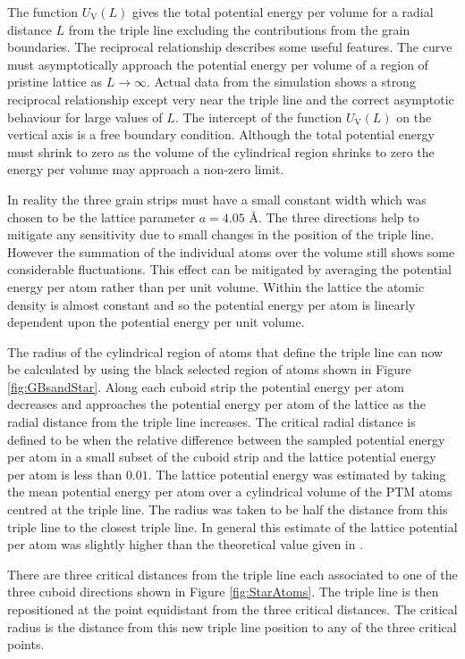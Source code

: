 \documentclass[12pt,a4paper,openany]{report}
\newcommand{\ts}[1]{\textrm{#1}}
\begin{document}
The function $U_{\ts{V}}(L)$ gives the total potential energy per volume for a radial distance $L$ from the triple line excluding the contributions from the grain boundaries. The reciprocal relationship describes some useful features. The curve must asymptotically approach the potential energy per volume of a region of pristine lattice as $L \rightarrow \infty$. Actual data from the simulation shows a strong reciprocal relationship except very near the triple line and the correct asymptotic behaviour for large values of $L$. The intercept  of the function $U_{\ts{V}}(L)$ on the vertical axis is a free boundary condition. Although the total potential energy must shrink to zero as the volume of the cylindrical region shrinks to zero the energy per volume may approach a non-zero limit. 

 
In reality the three grain strips must have a small constant width which was chosen to be the lattice parameter $a =4.05 \textrm{ \AA}$. The three directions help to mitigate any sensitivity due to small changes in the position of the triple line. However the summation of the individual atoms over the volume still shows some considerable fluctuations. This effect can be mitigated by averaging the potential energy per atom rather than per unit volume. Within the lattice the atomic density is almost constant and so the potential energy per atom is linearly dependent upon the potential energy per unit volume.

The radius of the cylindrical region of atoms that define the triple line can now be calculated by using the black selected region of atoms shown in Figure \ref{fig:GBsandStar}. Along each cuboid strip the potential energy per atom decreases and approaches the potential energy per atom of the lattice as the radial distance from the triple line increases. The critical radial distance is defined to be when the relative difference  between the sampled potential energy per atom in a small subset of the cuboid strip and the lattice potential energy per atom is less than $0.01$. The lattice potential energy was estimated by taking the mean potential energy per atom over a cylindrical volume of the PTM atoms centred at the triple line. The radius was taken to be half the distance from this triple line to the closest triple line. In general this estimate of the lattice potential per atom was slightly higher than the theoretical value given in \cite{Zope2003}.

There are three critical distances from the triple line each associated to one of the three cuboid directions shown in Figure \ref{fig:StarAtoms}. The triple line is then repositioned at the point equidistant from the three critical distances. The critical radius is the distance from this new triple line position to any of the three critical points.       
 
\end{document}
